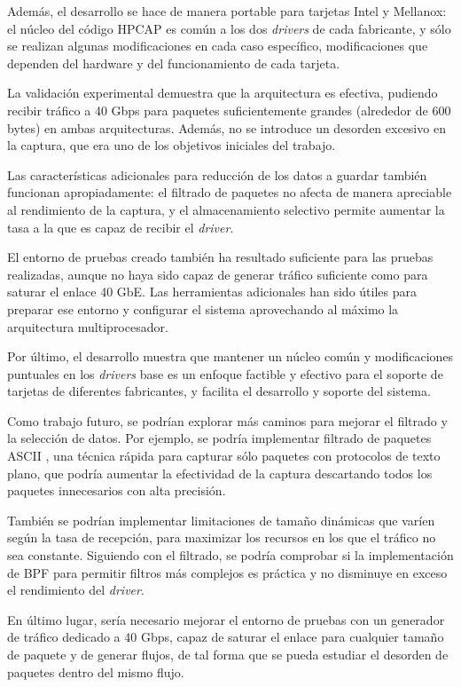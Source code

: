 \documentclass[twoside, 12pt]{epstfg}
\begin{document}
Además, el desarrollo se hace de manera portable para tarjetas Intel y Mellanox: el núcleo del código HPCAP es común a los dos \textit{drivers} de cada fabricante, y sólo se realizan algunas modificaciones en cada caso específico, modificaciones que dependen del hardware y del funcionamiento de cada tarjeta.

La validación experimental demuestra que la arquitectura es efectiva, pudiendo recibir tráfico a 40 Gbps para paquetes suficientemente grandes (alrededor de 600 bytes) en ambas arquitecturas. Además, no se introduce un desorden excesivo en la captura, que era uno de los objetivos iniciales del trabajo.

Las características adicionales para reducción de los datos a guardar también funcionan apropiadamente: el filtrado de paquetes no afecta de manera apreciable al rendimiento de la captura, y el almacenamiento selectivo permite aumentar la tasa a la que es capaz de recibir el \textit{driver}.

El entorno de pruebas creado también ha resultado suficiente para las pruebas realizadas, aunque no haya sido capaz de generar tráfico suficiente como para saturar el enlace 40 GbE. Las herramientas adicionales han sido útiles para preparar ese entorno y configurar el sistema aprovechando al máximo la arquitectura multiprocesador.

Por último, el desarrollo muestra que mantener un núcleo común y modificaciones puntuales en los \textit{drivers} base es un enfoque factible y efectivo para el soporte de tarjetas de diferentes fabricantes, y facilita el desarrollo y soporte del sistema.

Como trabajo futuro, se podrían explorar más caminos para mejorar el filtrado y la selección de datos. Por ejemplo, se podría implementar filtrado de paquetes ASCII \cite{ucedaselective}, una técnica rápida para capturar sólo paquetes con protocolos de texto plano, que podría aumentar la efectividad de la captura descartando todos los paquetes innecesarios con alta precisión.

También se podrían implementar limitaciones de tamaño dinámicas que varíen según la tasa de recepción, para maximizar los recursos en los que el tráfico no sea constante. Siguiendo con el filtrado, se podría comprobar si la implementación de \gls{BPF} para permitir filtros más complejos es práctica y no disminuye en exceso el rendimiento del \textit{driver}.

En último lugar, sería necesario mejorar el entorno de pruebas con un generador de tráfico dedicado a 40 Gbps, capaz de saturar el enlace para cualquier tamaño de paquete y de generar flujos, de tal forma que se pueda estudiar el desorden de paquetes dentro del mismo flujo.

\backmatter
\appendix

\printnoidxglossaries
\cleardoublepage

\nocite{*}
{}

\cleardoublepage
\printindex
\end{document}

